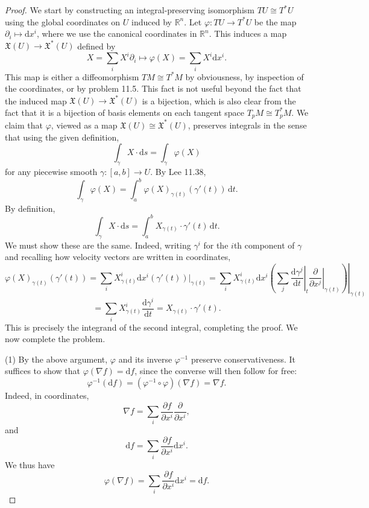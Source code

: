 \documentclass[11pt, letterpaper]{article}
\begin{document}
\begin{proof}
	We start by constructing an integral-preserving isomorphism $TU\cong T^*U$ using the global coordinates on $U$ induced by $\mathbb{R} ^n$. Let $\varphi : TU \to T^*U$ be the map $\partial _i \mapsto \mathrm{d} x^i$, where we use the canonical coordinates in $\mathbb{R} ^n$. This induces a map $\mathfrak{X} (U) \to \mathfrak{X} ^*(U)$ defined by
	\[
		X = \sum_{i} X^i \partial _i \mapsto \varphi (X) = \sum_{i} X^i \mathrm{d} x^i
	.\]
	This map is either a diffeomorphism $TM \cong T^*M$ by obviousness, by inspection of the coordinates, or by problem 11.5. This fact is not useful beyond the fact that the induced map $\mathfrak{X} (U) \to \mathfrak{X} ^*(U)$ is a bijection, which is also clear from the fact that it is a bijection of basis elements on each tangent space $T_pM \cong T_p^*M$. We claim that $\varphi $, viewed as a map $\mathfrak{X} (U) \cong \mathfrak{X} ^*(U)$, preserves integrals in the sense that using the given definition,
	\[
		\int_\gamma X \cdot \mathrm{d} s = \int_\gamma \varphi (X)
	\]
	for any piecewise smooth $\gamma : [a,b] \to U$. By Lee 11.38,
	\[
		\int_\gamma \varphi (X) = \int_a^b \varphi (X)_{\gamma (t)} (\gamma '(t))\,\mathrm{d} t
	.\]
	By definition,
	\[
		\int_\gamma X\cdot \mathrm{d} s = \int_a^b X_{\gamma (t)} \cdot \gamma '(t) \,\mathrm{d} t
	.\]
	We must show these are the same. Indeed, writing $\gamma ^i$ for the $i$th component of $\gamma $ and recalling how velocity vectors are written in coordinates,
	\[
		\varphi (X)_{\gamma (t)} (\gamma '(t))=\sum_{i} X^i_{\gamma (t)} \mathrm{d} x^i\left( \gamma '(t) \right) |_{\gamma (t)}=\sum_{i} X^i_{\gamma (t)}  \mathrm{d} x^i \left.\left( \sum_{j} \left.\frac{\mathrm{d}\gamma^j }{\mathrm{d}t}\right|_t\left. \frac{\partial }{\partial x^j}\right|_{\gamma (t)}   \right) \right|_{\gamma (t)} 
	\]
	\[
		=\sum_{i} X^i_{\gamma (t)}  \frac{\mathrm{d}\gamma ^i}{\mathrm{d}t} =X_{\gamma (t)}\cdot \gamma '(t)
	.\]
	This is precisely the integrand of the second integral, completing the proof. We now complete the problem.

	(1) By the above argument, $\varphi $ and its inverse $\varphi ^{-1} $ preserve conservativeness. It suffices to show that $\varphi(\nabla  f)=\mathrm{d}f$, since the converse will then follow for free:
	\[
		\varphi ^{-1} (\mathrm{d}f)=(\varphi ^{-1} \circ \varphi)(\nabla f)=\nabla f
	.\]
	Indeed, in coordinates,
	\[
		\nabla f = \sum_{i} \frac{\partial f}{\partial x^i} \frac{\partial }{\partial x^i},
	\]
	and
	\[
		\mathrm{d} f = \sum_{i} \frac{\partial f}{\partial x^i} \mathrm{d} x^i
	.\]
	We thus have
	\[
		\varphi (\nabla f)=\sum_{i} \frac{\partial f}{\partial x^i} \mathrm{d} x^i=\mathrm{d} f
	.\]
	

\end{proof}
\end{document}

